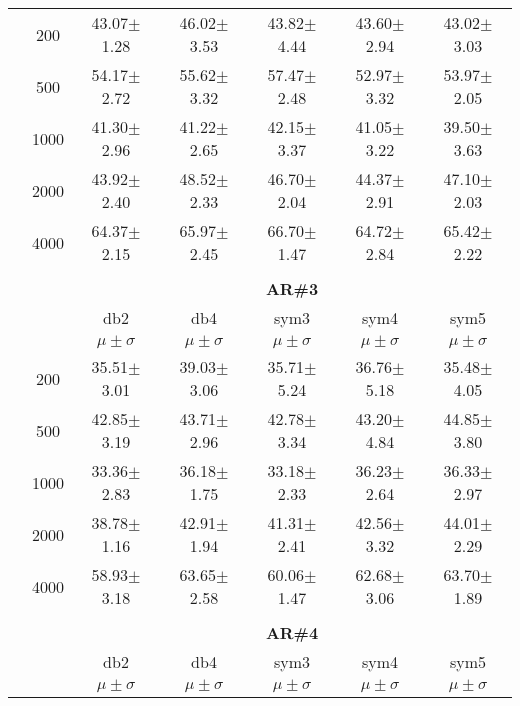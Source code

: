 \begin{table}[H]
\begin{tabular}{|c|c|c c c c c|}
\multicolumn{1}{|c|}{ \multirow{5}{*}{\rotatebox[origin=c]{90}{\textbf{Neurônios}}} }
&200	&43.07$\pm$1.28	&46.02$\pm$3.53	&43.82$\pm$4.44	&43.60$\pm$2.94	&43.02$\pm$3.03	\\\cline{2-7}
&500	&54.17$\pm$2.72	&55.62$\pm$3.32	&57.47$\pm$2.48	&52.97$\pm$3.32	&53.97$\pm$2.05	\\\cline{2-7}
&1000	&41.30$\pm$2.96	&41.22$\pm$2.65	&42.15$\pm$3.37	&41.05$\pm$3.22	&39.50$\pm$3.63	\\\cline{2-7}
&2000	&43.92$\pm$2.40	&48.52$\pm$2.33	&46.70$\pm$2.04	&44.37$\pm$2.91	&47.10$\pm$2.03	\\\cline{2-7}
&4000	&64.37$\pm$2.15	&65.97$\pm$2.45	&66.70$\pm$1.47	&64.72$\pm$2.84	&65.42$\pm$2.22	\\ \midrule
\multicolumn{7}{c}{}\\ 



\cline{3-7}
\multicolumn{2}{c|}{\multirow{3}{*}{}} & \multicolumn{5}{c|}{\textbf{AR\#3}}   \\\cline{3-7} 

\multicolumn{2}{c|}{}  & db2 & db4 & sym3 & sym4 & sym5 \\\cline{3-7}
\multicolumn{2}{c|}{}& $\mu \pm \sigma$ & $\mu \pm \sigma$ & $\mu \pm \sigma$ & $\mu \pm \sigma$ & $\mu \pm \sigma$ \\\hline

\multicolumn{1}{|c|}{ \multirow{5}{*}{\rotatebox[origin=c]{90}{\textbf{Neurônios}}} }
&200	&35.51$\pm$3.01	&39.03$\pm$3.06	&35.71$\pm$5.24	&36.76$\pm$5.18	&35.48$\pm$4.05	\\\cline{2-7}
&500	&42.85$\pm$3.19	&43.71$\pm$2.96	&42.78$\pm$3.34	&43.20$\pm$4.84	&44.85$\pm$3.80	\\\cline{2-7}
&1000	&33.36$\pm$2.83	&36.18$\pm$1.75	&33.18$\pm$2.33	&36.23$\pm$2.64	&36.33$\pm$2.97	\\\cline{2-7}
&2000	&38.78$\pm$1.16	&42.91$\pm$1.94	&41.31$\pm$2.41	&42.56$\pm$3.32	&44.01$\pm$2.29	\\\cline{2-7}
&4000	&58.93$\pm$3.18	&63.65$\pm$2.58	&60.06$\pm$1.47	&62.68$\pm$3.06	&63.70$\pm$1.89	
	\\\midrule 
\multicolumn{7}{c}{}\\ 



\cline{3-7}
\multicolumn{2}{c|}{\multirow{3}{*}{}} & \multicolumn{5}{c|}{\textbf{AR\#4}}   \\\cline{3-7} 

\multicolumn{2}{c|}{}  & db2 & db4 & sym3 & sym4 & sym5 \\\cline{3-7}
\multicolumn{2}{c|}{}& $\mu \pm \sigma$ & $\mu \pm \sigma$ & $\mu \pm \sigma$ & $\mu \pm \sigma$ & $\mu \pm \sigma$ \\\hline


\end{tabular}
\end{table}
